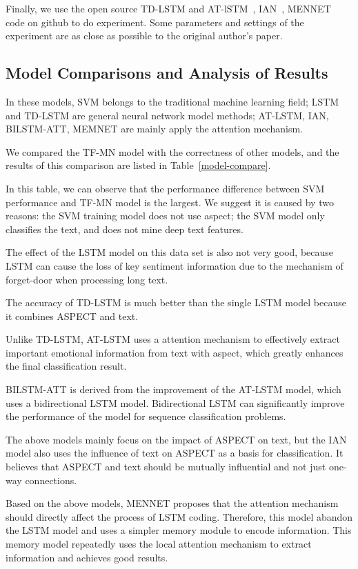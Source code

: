 \documentclass[runningheads, twocolumn]{llncs}
\begin{document}
Finally, we use the open source TD-LSTM and AT-lSTM~\cite{td-lstm_at-lstm}, IAN~\cite{IAN}, MENNET~\cite{MENNET} code on github to do experiment. Some parameters and settings of the experiment are as close as possible to the original author's paper.

\subsection{Model Comparisons and Analysis of Results}
In these models, SVM belongs to the traditional machine learning field; LSTM and TD-LSTM are general neural network model methods; AT-LSTM, IAN, BILSTM-ATT, MEMNET are mainly apply the attention mechanism.

We compared the TF-MN model with the correctness of other models, and the results of this comparison are listed in Table~\ref{model-compare}. 

In this table, we can observe that the performance difference between SVM performance and TF-MN model is the largest. We suggest it is caused by two reasons: the SVM training model does not use aspect; the SVM model only classifies the text, and does not mine deep text features. 
 
The effect of the LSTM model on this data set is also not very good, because LSTM can cause the loss of key sentiment information due to the mechanism of forget-door when processing long text.

The accuracy of TD-LSTM is much better than the single LSTM model because it combines ASPECT and text.

Unlike TD-LSTM, AT-LSTM uses a attention mechanism to effectively extract important emotional information from text with aspect, which greatly enhances the final classification result.

BILSTM-ATT is derived from the improvement of the AT-LSTM model, which uses a bidirectional LSTM model. Bidirectional LSTM can significantly improve the performance of the model for sequence classification problems.

The above models mainly focus on the impact of ASPECT on text, but the IAN model also uses the influence of text on ASPECT as a basis for classification. It believes that ASPECT and text should be mutually influential and not just one-way connections.

Based on the above models, MENNET proposes that the attention mechanism should directly affect the process of LSTM coding. Therefore, this model abandon the LSTM model and uses a simpler memory module to encode information. This memory model repeatedly uses the local attention mechanism to extract information and achieves good results.
\end{document}
